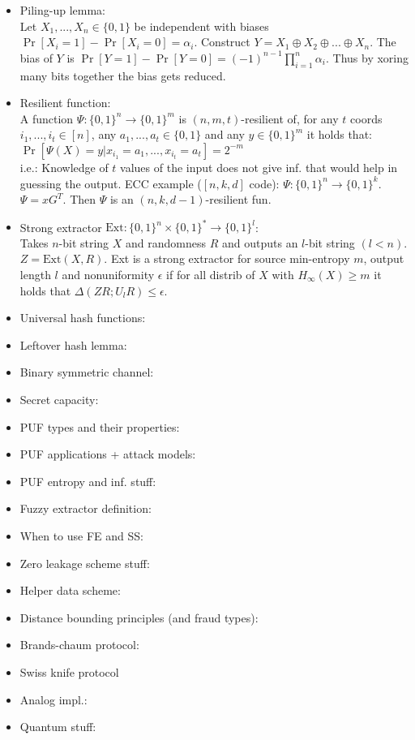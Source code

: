 \documentclass[twocolumn,9pt]{extarticle}
\begin{document}
\begin{itemize}
	\item Piling-up lemma: \\
	Let $X_1, ..., X_n \in \{0,1\}$ be independent with biases $\Pr[X_i=1]-\Pr[X_i=0]=\alpha_i$. Construct $Y = X_1 \oplus X_2 \oplus ... \oplus X_n$. The bias of $Y$ is $\Pr[Y=1]-\Pr[Y=0] = (-1)^{n-1} \prod_{i=1}^n \alpha_i$. Thus by xoring many bits together the bias gets reduced.

	\item Resilient function:\\
	A function $\Psi : \{0,1\}^n \rightarrow \{0,1\}^m$ is $(n,m,t)$-resilient of, for any $t$ coords $i_1,...,i_t \in [n]$, any $a_1,...,a_t \in \{0,1\}$ and any $y \in \{0,1\}^m$ it holds that: $\Pr[\Psi(X)=y|x_{i_1}=a_1,...,x_{i_t}=a_t] = 2^{-m}$\\
	i.e.: Knowledge of $t$ values of the input does not give inf. that would help in guessing the output. ECC example ($[n,k,d]$ code): $\Psi : \{0,1\}^n \rightarrow \{0,1\}^k$. $\Psi = xG^T$. Then $\Psi$ is an $(n,k,d-1)$-resilient fun.

	\item Strong extractor $\text{Ext} : \{0,1\}^n \times \{0,1\}^* \rightarrow \{0,1\}^l$:\\
	Takes $n$-bit string $X$ and randomness $R$ and outputs an $l$-bit string $(l < n)$. $Z = \text{Ext}(X,R)$. Ext is a strong extractor for source min-entropy $m$, output length $l$ and nonuniformity $\epsilon$ if for all distrib of $X$ with $H_\infty(X) \geq m$ it holds that $\Delta(ZR;U_lR) \leq \epsilon$.


	\item Universal hash functions:

	\item Leftover hash lemma:

	\item Binary symmetric channel:

	\item Secret capacity:

	\item PUF types and their properties:

	\item PUF applications + attack models:

	\item PUF entropy and inf. stuff:

	\item Fuzzy extractor definition:

	\item When to use FE and SS:

	\item Zero leakage scheme stuff:

	\item Helper data scheme:

	\item Distance bounding principles (and fraud types):

	\item Brands-chaum protocol:

	\item Swiss knife protocol

	\item Analog impl.:

	\item Quantum stuff:


\end{itemize}
\end{document}
